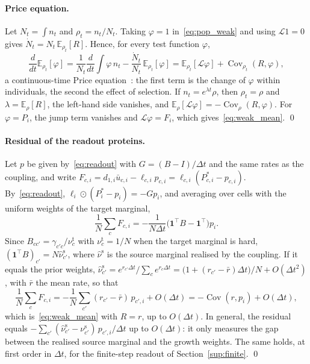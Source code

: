 \documentclass[a4paper, 11pt]{article}
\DeclareMathOperator{\Cov}{Cov}
\newcommand{\E}{\mathbb{E}}
\theoremstyle{plain}
\theoremstyle{remark}
\begin{document}
\paragraph{Price equation.} Let $N_t = \int n_t$ and $\rho_t = n_t / N_t$. Taking $\varphi = 1$ in~\eqref{eq:pop_weak} and using $\mathcal{L}1 = 0$ gives $\dot N_t = N_t\,\E_{\rho_t}[R]$. Hence, for every test function $\varphi$,
\[
\frac{d}{dt}\E_{\rho_t}[\varphi]
= \frac{1}{N_t}\frac{d}{dt}\int\varphi\,n_t - \frac{\dot N_t}{N_t}\,\E_{\rho_t}[\varphi]
= \E_{\rho_t}[\mathcal{L}\varphi] + \Cov_{\rho_t}(R, \varphi),
\]
a continuous-time Price equation~\cite{price1970selection, frank2012price}: the first term is the change of $\varphi$ within individuals, the second the effect of selection. If $n_t = e^{\lambda t}\rho$, then $\rho_t = \rho$ and $\lambda = \E_\rho[R]$, the left-hand side vanishes, and $\E_\rho[\mathcal{L}\varphi] = -\Cov_\rho(R,\varphi)$. For $\varphi = P_i$, the jump term vanishes and $\mathcal{L}\varphi = F_i$, which gives~\eqref{eq:weak_mean}. \qed

\paragraph{Residual of the readout proteins.} Let $p$ be given by~\eqref{eq:readout} with $G = (B - I)/\Delta t$ and the same rates as the coupling, and write $F_{c,i} = d_{1,i}\bar u_{c,i} - \ell_{c,i}p_{c,i} = \ell_{c,i}(P^\ast_{c,i} - p_{c,i})$. By~\eqref{eq:readout}, $\ell_i \odot (P^\ast_i - p_i) = -Gp_i$, and averaging over cells with the uniform weights of the target marginal,
\[
\frac1N\sum_c F_{c,i} = -\frac{1}{N\Delta t}\bigl(\mathbf{1}^\top B - \mathbf{1}^\top\bigr)p_i .
\]
Since $B_{cc'} = \gamma_{c'c}/\nu^{\mathrm{t}}_c$ with $\nu^{\mathrm{t}}_c = 1/N$ when the target marginal is hard, $(\mathbf{1}^\top B)_{c'} = N\hat\nu^{\mathrm{s}}_{c'}$, where $\hat\nu^{\mathrm{s}}$ is the source marginal realised by the coupling. If it equals the prior weights, $\hat\nu^{\mathrm{s}}_{c'} = e^{r_{c'}\Delta t}/\sum_c e^{r_c\Delta t} = \bigl(1 + (r_{c'} - \bar r)\Delta t\bigr)/N + O(\Delta t^2)$, with $\bar r$ the mean rate, so that
\[
\frac1N\sum_c F_{c,i} = -\frac1N\sum_{c'}(r_{c'} - \bar r)\,p_{c',i} + O(\Delta t) = -\Cov(r, p_i) + O(\Delta t),
\]
which is~\eqref{eq:weak_mean} with $R = r$, up to $O(\Delta t)$. In general, the residual equals $-\sum_{c'}(\hat\nu^{\mathrm{s}}_{c'} - \nu^{\mathrm{s}}_{c'})\,p_{c',i}/\Delta t$ up to $O(\Delta t)$: it only measures the gap between the realised source marginal and the growth weights. The same holds, at first order in $\Delta t$, for the finite-step readout of Section~\ref{sup:finite}. \qed
\end{document}
